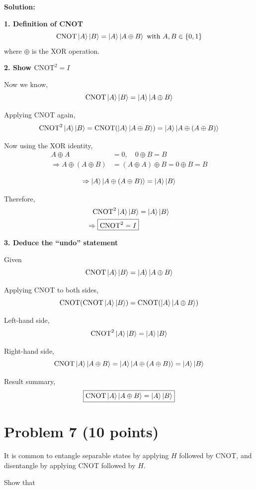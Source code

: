 \documentclass[11pt]{article}
\newenvironment{solution}
{\par\noindent\textbf{Solution:}\par}
{\vspace{1em}}
\begin{document}
\begin{solution}

\textbf{1. Definition of CNOT}
\[\text{CNOT}\ket{A}\ket{B} = \ket{A}\ket{A \oplus B} \text{ with } A,B \in \{0, 1\}\]
where $\oplus$ is the XOR operation.

\textbf{2. Show $\text{CNOT}^2 = I$}

Now we know,
\[
\text{CNOT}\ket{A}\ket{B} = \ket{A}\ket{A \oplus B}
\]

Applying CNOT again,
\[\text{CNOT}^2 \ket{A}\ket{B} = \text{CNOT} (\ket{A}\ket{A \oplus B}) = \ket{A}\ket{A \oplus (A \oplus B)}
\]

Now using the XOR identity,
\[\begin{aligned}
A \oplus A &= 0, \quad 0 \oplus B = B \\
\Rightarrow A \oplus (A \oplus B) &= (A \oplus A) \oplus B = 0 \oplus B = B
\end{aligned}\]

\[
\Rightarrow \ket{A}\ket{A \oplus (A \oplus B)} = \ket{A}\ket{B}
\]

Therefore,
\[\begin{aligned}
\text{CNOT}^2 \ket{A}\ket{B} &= \ket{A}\ket{B} \\
\Rightarrow \boxed{\text{CNOT}^2 = I}
\end{aligned}\]

\textbf{3. Deduce the “undo” statement}

Given
\[
\text{CNOT}\ket{A}\ket{B} = \ket{A}\ket{A \oplus B}
\]

Applying CNOT to both sides,
\[
\text{CNOT}(\text{CNOT}\ket{A}\ket{B}) = \text{CNOT}(\ket{A}\ket{A \oplus B})
\]

Left-hand side,
\[
\text{CNOT}^2 \ket{A}\ket{B} = \ket{A}\ket{B}
\]

Right-hand side,
\[
\text{CNOT}\ket{A}\ket{A \oplus B} = \ket{A}\ket{A \oplus (A \oplus B)} = \ket{A}\ket{B}
\]

Result summary,
\[
\boxed{\text{CNOT}\ket{A}\ket{A \oplus B} = \ket{A}\ket{B}}
\]

\end{solution}

\section*{Problem 7 (10 points)}
It is common to entangle separable states by applying $H$ followed by CNOT, and disentangle by applying CNOT followed by $H$.

Show that
\end{document}
